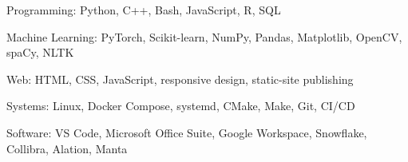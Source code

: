 Programming: Python, C++, Bash, JavaScript, R, SQL\par
Machine Learning: PyTorch, Scikit-learn, NumPy, Pandas, Matplotlib, OpenCV, spaCy, NLTK\par
Web: HTML, CSS, JavaScript, responsive design, static-site publishing\par
Systems: Linux, Docker Compose, systemd, CMake, Make, Git, CI/CD\par
Software: VS Code, Microsoft Office Suite, Google Workspace, Snowflake, Collibra, Alation, Manta